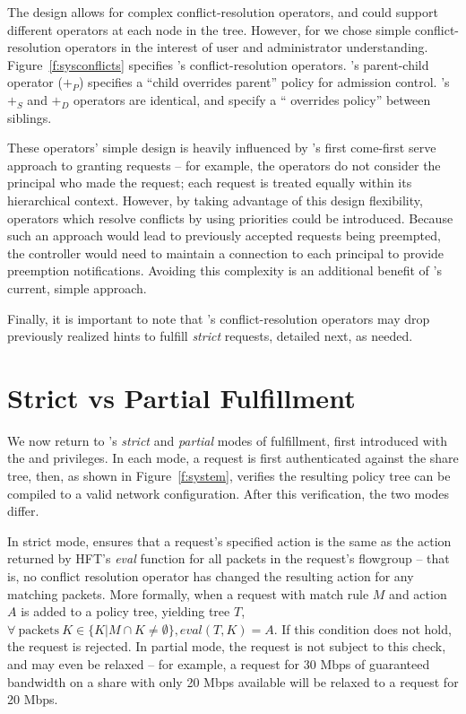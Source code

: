 The \treelang design allows for complex
conflict-resolution operators, and could support different operators at
each node in the tree.
However, for \sys we chose simple conflict-resolution operators in the
interest of user and administrator understanding.
Figure~\ref{f:sysconflicts} specifies \sys's conflict-resolution
operators.
\sys's parent-child operator ($+_P$) specifies a ``child
overrides parent'' policy for admission control. \sys's $+_S$ and $+_D$
operators are identical, and specify a `` overrides
 policy'' between siblings.

These operators' simple design is heavily influenced by \sys's
first come-first serve approach to granting requests -- for example,
the operators do not consider the principal who made the request;
each request is treated equally within its hierarchical context.
However, by taking advantage of this design flexibility, operators
which resolve conflicts by using priorities could be introduced.
Because such an approach would lead to previously accepted requests
being preempted, the \sys controller would need to maintain a
connection to each principal to provide preemption notifications.
Avoiding this complexity is an additional benefit of \sys's current,
simple approach.

Finally, it is important to note that \sys's conflict-resolution operators
may drop previously realized hints to fulfill \emph{strict} requests,
detailed next, as needed.

\section{Strict vs Partial Fulfillment}
\label{sec:strict-partial}

We now return to \sys's \emph{strict} and \emph{partial} modes of
fulfillment, first introduced with the  and 
privileges. In each mode, a request is first authenticated against the
share tree, then, as shown in Figure~\ref{f:system}, \sys verifies the resulting policy tree can be
compiled to a valid network configuration.
After this verification, the two modes differ.

In strict mode, \sys ensures that a request's specified action
is the same as the action returned by HFT's \emph{eval}
function for all packets in the request's flowgroup -- that is, no
conflict resolution operator has changed the resulting action for
any matching packets.
More formally, when a request with match rule $M$ and action
$A$ is added to a policy tree, yielding tree $T$,
$\forall\ \mathrm{packets}\ K \in \{ K | M \cap K \ne \emptyset \}, \mathit{eval} (T, K) = A$.
If this condition does not hold, the request is rejected.
In partial mode, the request is not subject to this check, and may
even be relaxed -- for example, a request for 30 Mbps of guaranteed
bandwidth on a share with only 20 Mbps available will be relaxed
to a request for 20 Mbps. 

